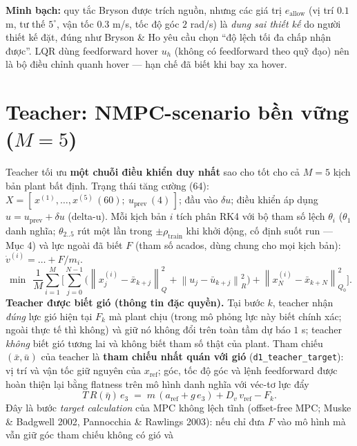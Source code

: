 \documentclass[11pt]{article}
\newcommand{\norm}[1]{\left\lVert #1 \right\rVert}
\begin{document}
\noindent\textbf{Minh bạch:} quy tắc Bryson được trích nguồn, nhưng các giá trị $e_{\mathrm{allow}}$ (vị
trí $0.1$ m, tư thế $5^\circ$, vận tốc $0.3$ m/s, tốc độ góc $2$ rad/s) là \emph{dung sai thiết kế} do
người thiết kế đặt, đúng như Bryson \& Ho yêu cầu chọn ``độ lệch tối đa chấp nhận được''. LQR dùng
feedforward hover $u_h$ (không có feedforward theo quỹ đạo) nên là bộ điều chỉnh quanh hover — hạn chế
đã biết khi bay xa hover.


\section{Teacher: NMPC-scenario bền vững ($M=5$)}
Teacher tối ưu \textbf{một chuỗi điều khiển duy nhất} sao cho tốt cho cả $M{=}5$ kịch bản plant bất định.
Trạng thái tăng cường (64): $X=[\,x^{(1)}\!,\dots,x^{(5)}\,(60);\ u_{\mathrm{prev}}\,(4)\,]$; đầu vào
$\delta u$; điều khiển áp dụng $u=u_{\mathrm{prev}}+\delta u$ (delta-u). Mỗi kịch bản $i$ tích phân RK4
với bộ tham số lệch $\theta_i$ ($\theta_1$ danh nghĩa; $\theta_{2..5}$ rút một lần trong
$\pm\rho_{\mathrm{train}}$ khi khởi động, cố định suốt run --- Mục 4) và lực ngoài đã biết $F$ (tham số
acados, dùng chung cho mọi kịch bản): $\dot v^{(i)}=\dots+F/m_i$.
\[
\min\ \ \frac{1}{M}\sum_{i=1}^{M}\Big[\sum_{j=0}^{N-1}
\Big(\norm{x^{(i)}_j-\bar x_{k+j}}_{Q}^2 + \norm{u_j-\bar u_{k+j}}_{R}^2\Big)
+\norm{x^{(i)}_N-\bar x_{k+N}}_{Q_0}^2\Big].
\]
\textbf{Teacher được biết gió (thông tin đặc quyền).} Tại bước $k$, teacher nhận \emph{đúng} lực gió hiện tại
$F_k$ mà plant chịu (trong mô phỏng lực này biết chính xác; ngoài thực tế thì không) và giữ nó không đổi trên
toàn tầm dự báo $1$ s; teacher \emph{không} biết gió tương lai và không biết tham số thật của plant.
Tham chiếu $(\bar x,\bar u)$ của teacher là \textbf{tham chiếu nhất quán với gió} (\texttt{d1\_teacher\_target}):
vị trí và vận tốc giữ nguyên của $x_{\mathrm{ref}}$; góc, tốc độ góc và lệnh feedforward được hoàn thiện lại
bằng flatness trên mô hình danh nghĩa với véc-tơ lực đẩy
\[
T\,R(\bar\eta)\,e_3 \;=\; m\,(a_{\mathrm{ref}}+g\,e_3)+D_v\,v_{\mathrm{ref}}-F_k .
\]
Đây là bước \emph{target calculation} của MPC không lệch tĩnh (offset-free MPC; Muske \& Badgwell 2002,
Pannocchia \& Rawlings 2003): nếu chỉ đưa $F$ vào mô hình mà vẫn giữ góc tham chiếu không có gió và
\end{document}
